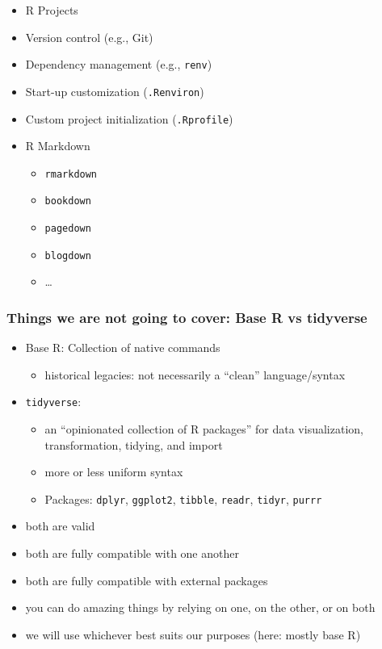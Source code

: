 \documentclass[
  11pt,
]{article}
\providecommand{\tightlist}{%
  \setlength{\itemsep}{0pt}\setlength{\parskip}{0pt}}
\begin{document}
\begin{itemize}
\tightlist
\item
  R Projects
\item
  Version control (e.g., Git)
\item
  Dependency management (e.g., \texttt{renv})
\item
  Start-up customization (\texttt{.Renviron})
\item
  Custom project initialization (\texttt{.Rprofile})
\item
  R Markdown

  \begin{itemize}
  \tightlist
  \item
    \texttt{rmarkdown}
  \item
    \texttt{bookdown}
  \item
    \texttt{pagedown}
  \item
    \texttt{blogdown}
  \item
    \ldots{}
  \end{itemize}
\end{itemize}

\hypertarget{things-we-are-not-going-to-cover-base-r-vs-tidyverse}{%
\subsubsection{Things we are not going to cover: Base R vs tidyverse}\label{things-we-are-not-going-to-cover-base-r-vs-tidyverse}}

\begin{itemize}
\tightlist
\item
  Base R: Collection of native commands

  \begin{itemize}
  \tightlist
  \item
    historical legacies: not necessarily a ``clean'' language/syntax
  \end{itemize}
\item
  \texttt{tidyverse}:

  \begin{itemize}
  \tightlist
  \item
    an ``opinionated collection of R packages'' for data visualization, transformation, tidying, and import
  \item
    more or less uniform syntax
  \item
    Packages: \texttt{dplyr}, \texttt{ggplot2}, \texttt{tibble}, \texttt{readr}, \texttt{tidyr}, \texttt{purrr}
  \end{itemize}
\item
  both are valid
\item
  both are fully compatible with one another
\item
  both are fully compatible with external packages
\item
  you can do amazing things by relying on one, on the other, or on both
\item
  we will use whichever best suits our purposes (here: mostly base R)
\end{itemize}
\end{document}

